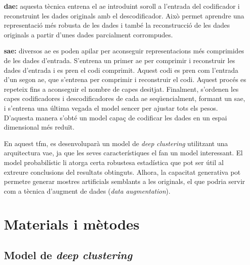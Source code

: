\documentclass[CAT,BIB]{TFUOC}%
\begin{document}
        \textbf{\Gls{dae}:} aquesta tècnica entrena el \gls{ae} introduint soroll a l'entrada del codificador i reconstruint les dades originals amb el descodificador. Això permet aprendre una representació més robusta de les dades i també la reconstrucció de les dades originals a partir d'unes dades parcialment corrompudes.

        \textbf{\Gls{sae}:} diversos \gls{ae} es poden apilar per aconseguir representacions més comprimides de les dades d'entrada. S'entrena un primer \gls{ae} per comprimir i reconstruir les dades d'entrada i es pren el codi comprimit. Aquest codi es pren com l'entrada d'un segon \gls{ae}, que s'entrena per comprimir i reconstruir el codi. Aquest procés es repeteix fins a aconseguir el nombre de capes desitjat. Finalment, s'ordenen les capes codificadores i descodificadores de cada \gls{ae} seqüencialment, formant un \gls{sae}, i s'entrena una última vegada el model sencer per ajustar tots els pesos. D'aquesta manera s'obté un model capaç de codificar les dades en un espai dimensional més reduït.

        En aquest \gls{tfm}, es desenvoluparà un model de \textit{deep clustering} utilitzant una arquitectura \gls{vae}, ja que les seves característiques el fan un model interessant. El model probabilístic li atorga certa robustesa estadística que pot ser útil al extreure conclusions del resultats obtinguts. Alhora, la capacitat generativa pot permetre generar mostres artificials semblants a les originals, el que podria servir com a tècnica d'augment de dades (\textit{data augmentation}).


\chapter{Materials i mètodes}

    \section{Model de \textit{deep clustering}}
    \label{s:metodes_dc}
\end{document}
